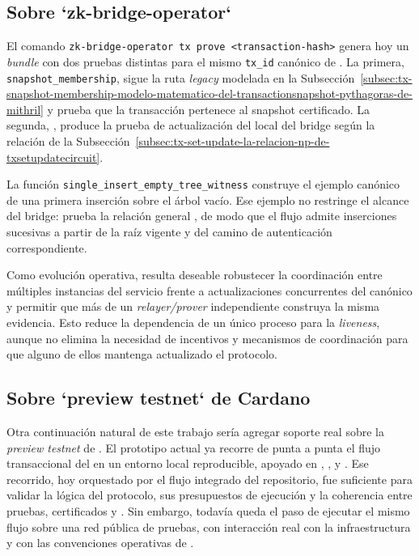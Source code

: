 \subsection{Sobre `zk-bridge-operator`}
\label{subsec:conclusions-and-future-work-sobre-zk-bridge-operator}

El comando \texttt{zk-bridge-operator tx prove <transaction-hash>} genera hoy un \textit{bundle} con dos pruebas distintas para el mismo \texttt{tx\_id} canónico de \Cardano. La primera, \texttt{snapshot\_membership}, sigue la ruta \textit{legacy} modelada en la Subsección~\ref{subsec:tx-snapshot-membership-modelo-matematico-del-transactionsnapshot-pythagoras-de-mithril} y prueba que la transacción pertenece al snapshot certificado. La segunda, \TxSetUpdateCircuit, produce la prueba de actualización del \SMT local del bridge según la relación de la Subsección~\ref{subsec:tx-set-update-la-relacion-np-de-txsetupdatecircuit}.

La función \texttt{single\_insert\_empty\_tree\_witness} construye el ejemplo canónico de una primera inserción sobre el árbol vacío. Ese ejemplo no restringe el alcance del bridge: \TxSetUpdateCircuit prueba la relación general \TxSetUpdateRelation, de modo que el flujo admite inserciones sucesivas a partir de la raíz vigente y del camino de autenticación correspondiente.

Como evolución operativa, resulta deseable robustecer la coordinación entre múltiples instancias del servicio frente a actualizaciones concurrentes del \UTxO canónico y permitir que más de un \textit{relayer/prover} independiente construya la misma evidencia. Esto reduce la dependencia de un único proceso para la \textit{liveness}, aunque no elimina la necesidad de incentivos y mecanismos de coordinación para que alguno de ellos mantenga actualizado el protocolo.

\subsection{Sobre `preview testnet` de Cardano}
\label{subsec:conclusions-and-future-work-sobre-preview-testnet-de-cardano}

Otra continuación natural de este trabajo sería agregar soporte \Onchain real sobre la \textit{preview testnet} de \Cardano. El prototipo actual ya recorre de punta a punta el flujo transaccional del \zkBridge en un entorno local reproducible, apoyado en \Dolos, \TxThree, \Trix y \CShell. Ese recorrido, hoy orquestado por el flujo integrado del repositorio, fue suficiente para validar la lógica del protocolo, sus presupuestos de ejecución y la coherencia entre pruebas, certificados y \UTxOs. Sin embargo, todavía queda el paso de ejecutar el mismo flujo sobre una red pública de pruebas, con interacción real con la infraestructura y con las convenciones operativas de \Cardano.

